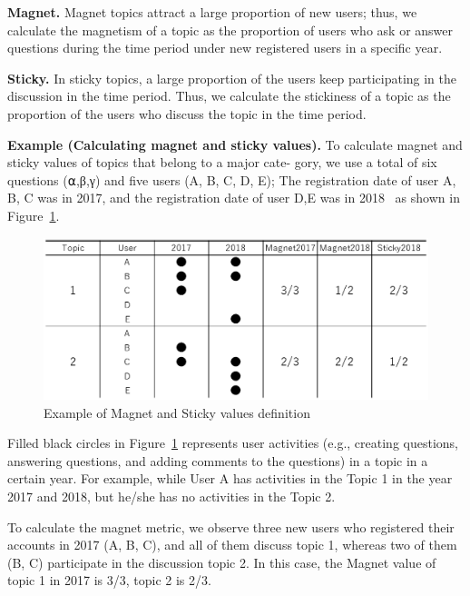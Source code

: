 \documentclass[conference]{IEEEtran}
\begin{document}
\noindent
\textbf{Magnet.} Magnet topics attract a large proportion of new users; thus, we calculate the magnetism of a topic as the proportion of users who ask or answer questions during the time period under new registered users in a specific year.

\noindent
\textbf{Sticky.} In sticky topics, a large proportion of the users keep participating in the discussion in the time period. Thus, we calculate the stickiness of a topic as the proportion of the users who discuss the topic in the time period.

\noindent
\textbf{Example (Calculating magnet and sticky values).}
To calculate magnet and sticky values of topics that belong to a major cate- gory, we use a total of six questions (⍺,β,γ) and five users (A, B, C, D, E); The registration date of user A, B, C was in 2017, and the registration date of user D,E was in 2018~\cite{yamashita2016magnet} as shown in Figure~\ref{fig:example1}.

\begin{figure}[t]
 \centering
 \includegraphics[width=.75\hsize]{img/fig11.eps}  
 \caption{Example of Magnet and Sticky values definition} 
 \label{fig:example1} 
\end{figure}

Filled black circles in Figure~\ref{fig:example1} represents user activities (e.g., creating questions, answering questions, and adding comments to the questions) in a topic in a certain year. For example, while User A has activities in the Topic 1 in the year 2017 and 2018, but he/she has no activities in the Topic 2.

To calculate the magnet metric, we observe three new users who registered their accounts in 2017 (A, B, C), and all of them discuss topic 1, whereas two of them (B, C) participate in the discussion topic 2. In this case, the Magnet value of topic 1 in 2017 is 3/3, topic 2 is 2/3. 
\end{document}

